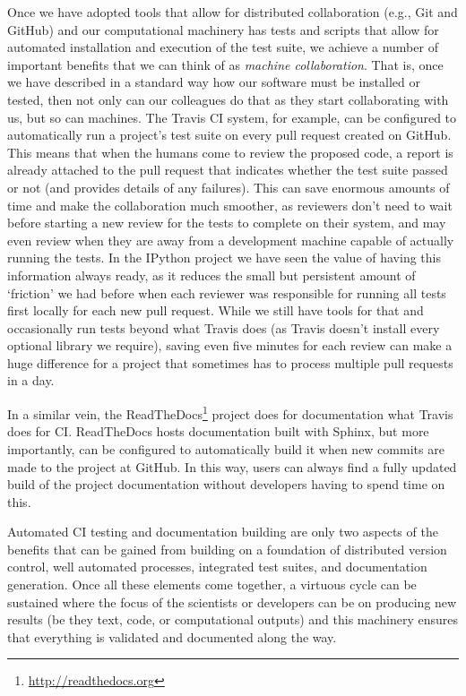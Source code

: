 \documentclass[11pt,oneside,english]{article}
\begin{document}
Once we have adopted tools that allow for distributed collaboration (e.g., Git
and GitHub) and our computational machinery has tests and scripts that allow
for automated installation and execution of the test suite, we achieve a number
of important benefits that we can think of as \emph{machine collaboration}.
That is, once we have described in a standard way how our software must be
installed or tested, then not only can our colleagues do that as they start
collaborating with us, but so can machines.  The Travis CI system, for example,
can be configured to automatically run a project's test suite on every pull
request created on GitHub.  This means that when the humans come to review the
proposed code, a report is already attached to the pull request that indicates
whether the test suite passed or not (and provides details of any failures).
This can save enormous amounts of time and make the collaboration much
smoother, as reviewers don't need to wait before starting a new review for the
tests to complete on their system, and may even review when they are away from
a development machine capable of actually running the tests.  In the IPython
project we have seen the value of having this information always ready, as it
reduces the small but persistent amount of `friction' we had before when each
reviewer was responsible for running all tests first locally for each new pull
request.  While we still have tools for that and occasionally run tests beyond
what Travis does (as Travis doesn't install every optional library we require),
saving even five minutes for each review can make a huge difference for a
project that sometimes has to process multiple pull requests in a day.

In a similar vein, the ReadTheDocs\footnote{\url{http://readthedocs.org}}
project does for documentation what Travis does for CI.  ReadTheDocs hosts
documentation built with Sphinx, but more importantly, can be configured to
automatically build it when new commits are made to the project at GitHub.  In
this way, users can always find a fully updated build of the project
documentation without developers having to spend time on this.

Automated CI testing and documentation building are only two aspects of the
benefits that can be gained from building on a foundation of distributed
version control, well automated processes, integrated test suites, and
documentation generation.  Once all these elements come together, a virtuous
cycle can be sustained where the focus of the scientists or developers can be
on producing new results (be they text, code, or computational outputs) and this
machinery ensures that everything is validated and documented along the way.
\end{document}
